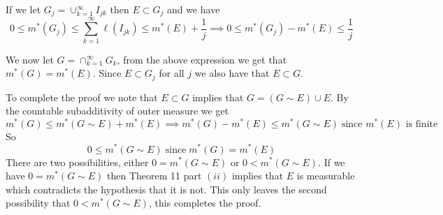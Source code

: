 \documentclass[11pt,reqno]{article}
\begin{document}
\noindent If we let $G_j = \cup_{k = 1}^\infty I_{jk}$ then $E \subset G_j$ and we have 
\[ 0 \le m^*(G_j) \le \sum_{k=1}^\infty \ell(I_{jk}) \le m^*(E) + \frac{1}{j} \implies 0 \le m^*(G_j) - m^*(E) \le \frac{1}{j} \]

\noindent We now let $G = \cap_{k = 1}^\infty G_k$, from the above expression we get that $m^*(G) = m^*(E)$. Since $E \subset G_j$ for all $j$ we also have that $E \subset G$.

To complete the proof we note that $E \subset G$ implies that $G = (G \sim E) \cup E$. By the countable subadditivity of outer measure we get 
\[ m^*(G) \le m^*(G \sim E) + m^*(E) \implies m^*(G) - m^*(E) \le m^*(G \sim E) \; \text{since $m^*(E)$ is finite} \]
\noindent So
\[ 0 \le m^*(G \sim E) \; \text{since} \; m^*(G) = m^*(E) \]
There are two possibilities, either $0 = m^*(G \sim E)$ or $0 < m^*(G \sim E)$. If we have $0 = m^*(G \sim E)$ then Theorem 11 part $(ii)$ implies that $E$ is measurable which contradicts the hypothesis that it is not. This only leaves the second possibility that $0 < m^*(G \sim E)$, this completes the proof.
\end{document}
